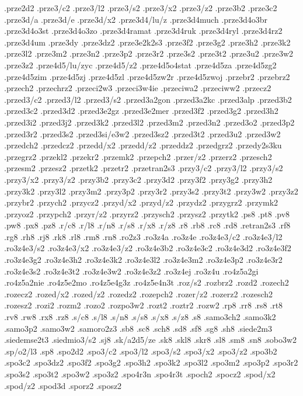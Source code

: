 {.prze2d2
.prze3/c2
.prze3/l2
.prze3/s2
.prze3/x2
.prze3/z2
.prze3b2
.prze3c2
.prze3d/a
.prze3d/e
.prze3d/x2
.prze3d4/lu/z
.prze3d4much
.prze3d4o3br
.prze3d4o3st
.prze3d4o3zo
.prze3d4ramat
.prze3d4ruk
.prze3d4ryl
.prze3d4rz2
.prze3d4um
.prze3dy
.prze3dz2
.prze3e2k2s3
.prze3f2
.prze3g2
.prze3h2
.prze3k2
.prze3l2
.prze3m2
.prze3n2
.prze3p2
.prze3r2
.prze3s2
.prze3t2
.prze3u2
.prze3w2
.prze3z2
.prze4d5/lu/zyc
.prze4d5/z2
.prze4d5o4stat
.prze4d5za
.prze4d5zg2
.prze4d5zim
.prze4d5zj
.prze4d5zl
.prze4d5zw2r
.prze4d5zwoj
.przebr2
.przebrz2
.przech2
.przechrz2
.przeci2w3
.przeci3w4ie
.przeciwa2
.przeciww2
.przecz2
.przed3/c2
.przed3/l2
.przed3/s2
.przed3a2gon
.przed3a2kc
.przed3alp
.przed3b2
.przed3c2
.przed3d2
.przed3e2gz
.przed3e2mer
.przed3f2
.przed3g2
.przed3h2
.przed3i2
.przed3j2
.przed3k2
.przed3l2
.przed3m2
.przed3n2
.przed3o2
.przed3p2
.przed3r2
.przed3s2
.przed3si/e3w2
.przed3sz2
.przed3t2
.przed3u2
.przed3w2
.przedch2
.przedcz2
.przedd/x2
.przedd/z2
.przeddz2
.przedgrz2
.przedy2s3ku
.przegrz2
.przekl2
.przekr2
.przemk2
.przepch2
.przer/z2
.przerz2
.przesch2
.przesm2
.przesz2
.przetk2
.przetr2
.przetran2s3
.przy3/c2
.przy3/l2
.przy3/s2
.przy3/x2
.przy3/z2
.przy3b2
.przy3c2
.przy3d2
.przy3f2
.przy3g2
.przy3h2
.przy3k2
.przy3l2
.przy3m2
.przy3p2
.przy3r2
.przy3s2
.przy3t2
.przy3w2
.przy3z2
.przybr2
.przych2
.przycz2
.przyd/x2
.przyd/z2
.przydz2
.przygrz2
.przymk2
.przyoz2
.przypch2
.przyr/z2
.przyrz2
.przysch2
.przysz2
.przytk2
.ps8
.pt8
.pv8
.pw8
.px8
.pz8
.r/c8
.r/l8
.r/n8
.r/s8
.r/x8
.r/z8
.r8
.rb8
.rc8
.rd8
.retran2s3
.rf8
.rg8
.rh8
.rj8
.rk8
.rl8
.rm8
.rn8
.ro2z3
.ro3z4a
.ro3z4e
.ro3z4e3/c2
.ro3z4e3/l2
.ro3z4e3/s2
.ro3z4e3/x2
.ro3z4e3/z2
.ro3z4e3b2
.ro3z4e3c2
.ro3z4e3d2
.ro3z4e3f2
.ro3z4e3g2
.ro3z4e3h2
.ro3z4e3k2
.ro3z4e3l2
.ro3z4e3m2
.ro3z4e3p2
.ro3z4e3r2
.ro3z4e3s2
.ro3z4e3t2
.ro3z4e3w2
.ro3z4e3z2
.ro3z4ej
.ro3z4u
.ro4z5a2gi
.ro4z5a2nie
.ro4z5e2mo
.ro4z5e4g3z
.ro4z5e4n3t
.roz/s2
.rozbrz2
.rozd2
.rozech2
.rozecz2
.rozed/x2
.rozed/z2
.rozedz2
.rozepch2
.rozer/z2
.rozerz2
.rozesch2
.rozesz2
.rozi2
.rozm2
.rozo2
.rozpo3w2
.rozt2
.roztr2
.rozw2
.rp8
.rr8
.rs8
.rt8
.rv8
.rw8
.rx8
.rz8
.s/c8
.s/l8
.s/n8
.s/s8
.s/x8
.s/z8
.s8
.samo3ch2
.samo3k2
.samo3p2
.samo3w2
.samoro2z3
.sb8
.sc8
.sch8
.sd8
.sf8
.sg8
.sh8
.siede2m3
.siedemse2t3
.siedmio3/s2
.sj8
.sk/a2d5/ze
.sk8
.skl8
.skr8
.sl8
.sm8
.sn8
.sobo3w2
.sp/o2/l3
.sp8
.spo2d2
.spo3/c2
.spo3/l2
.spo3/s2
.spo3/x2
.spo3/z2
.spo3b2
.spo3c2
.spo3dz2
.spo3f2
.spo3g2
.spo3h2
.spo3k2
.spo3l2
.spo3m2
.spo3p2
.spo3r2
.spo3s2
.spo3t2
.spo3w2
.spo3z2
.spo4r3n
.spo4r3t
.spoch2
.spocz2
.spod/x2
.spod/z2
.spod3d
.sporz2
.sposz2
}
